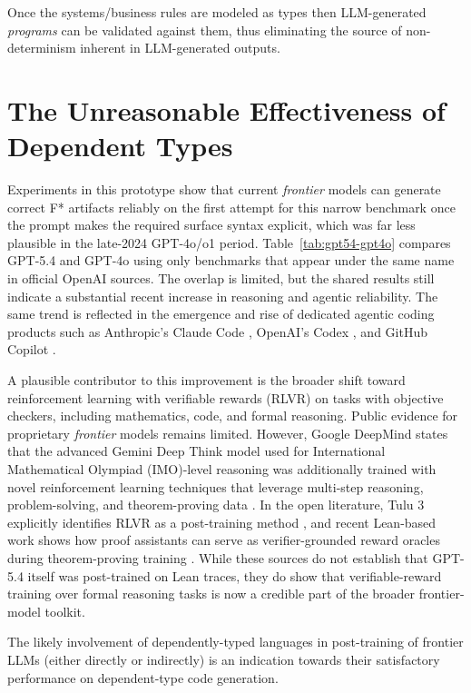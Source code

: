 \documentclass[conference]{IEEEtran}
\begin{document}
Once the systems/business rules are modeled as types then LLM-generated \textit{programs} can be validated against them, thus eliminating the source of non-determinism inherent in LLM-generated outputs.

\section{The Unreasonable Effectiveness of Dependent Types}
Experiments in this prototype show that current \textit{frontier} models can generate correct F* artifacts reliably on the first attempt for this narrow benchmark once the prompt makes the required surface syntax explicit, which was far less plausible in the late-2024 GPT-4o/o1 period. Table~\ref{tab:gpt54-gpt4o} compares GPT-5.4 and GPT-4o using only benchmarks that appear under the same name in official OpenAI sources. The overlap is limited, but the shared results still indicate a substantial recent increase in reasoning and agentic reliability. The same trend is reflected in the emergence and rise of dedicated agentic coding products such as Anthropic's Claude Code \cite{claude_code_overview}, OpenAI's Codex \cite{codex_openai}, and GitHub Copilot \cite{github_copilot_features}.

A plausible contributor to this improvement is the broader shift toward reinforcement learning with verifiable rewards (RLVR) \cite{rlvr_grpo} on tasks with objective checkers, including mathematics, code, and formal reasoning. Public evidence for proprietary \textit{frontier} models remains limited. However, Google DeepMind states that the advanced Gemini Deep Think model used for International Mathematical Olympiad (IMO)-level reasoning \cite{imo_official} was additionally trained with novel reinforcement learning techniques that leverage multi-step reasoning, problem-solving, and theorem-proving data \cite{gemini_deep_think_imo}. In the open literature, Tulu 3 explicitly identifies RLVR as a post-training method \cite{tulu3_rlvr}, and recent Lean-based work shows how proof assistants can serve as verifier-grounded reward oracles during theorem-proving training \cite{process_verified_rl_lean}. While these sources do not establish that GPT-5.4 itself was post-trained on Lean traces, they do show that verifiable-reward training over formal reasoning tasks is now a credible part of the broader frontier-model toolkit.

The likely involvement of dependently-typed languages in post-training of frontier LLMs (either directly or indirectly) is an indication towards their satisfactory performance on dependent-type code generation.
\end{document}
